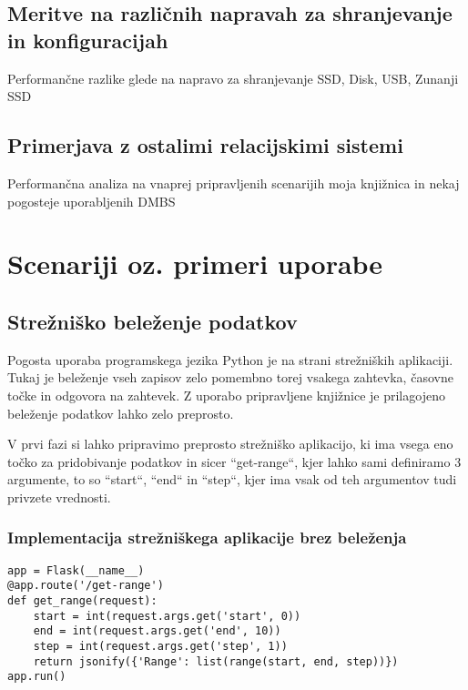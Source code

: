 \documentclass[a4paper,12pt,openright]{book}
\begin{document}
   \section{Meritve na različnih napravah za shranjevanje in konfiguracijah}
   \colorbox{BurntOrange}{Performančne razlike glede na napravo za shranjevanje}
   \newline
   \colorbox{BurntOrange}{SSD, Disk, USB, Zunanji SSD}
   
   \section{Primerjava z ostalimi relacijskimi sistemi}
   \colorbox{BurntOrange}{Performančna analiza na vnaprej pripravljenih scenarijih}
   \newline
   \colorbox{BurntOrange}{moja knjižnica in nekaj pogosteje uporabljenih DMBS}
    
\chapter{Scenariji oz. primeri uporabe}
\label{ch3}
    \section{Strežniško beleženje podatkov}

    Pogosta uporaba programskega jezika Python je na strani strežniških aplikaciji. Tukaj je beleženje vseh zapisov zelo pomembno torej vsakega zahtevka, časovne točke in odgovora na zahtevek. Z uporabo pripravljene knjižnice je prilagojeno beleženje podatkov lahko zelo preprosto.

    V prvi fazi si lahko pripravimo preprosto strežniško aplikacijo, ki ima vsega eno točko za pridobivanje podatkov in sicer ``get-range``, kjer lahko sami definiramo 3 argumente, to so ``start``, ``end`` in ``step``, kjer ima vsak od teh argumentov tudi privzete vrednosti.

    \subsection{Implementacija strežniškega aplikacije brez beleženja}
\begin{verbatim}
app = Flask(__name__)
@app.route('/get-range')
def get_range(request):
    start = int(request.args.get('start', 0))
    end = int(request.args.get('end', 10))
    step = int(request.args.get('step', 1))
    return jsonify({'Range': list(range(start, end, step))})
app.run()
\end{verbatim}
\end{document}
